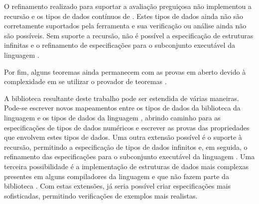 O refinamento realizado para suportar a avaliação preguiçosa não implementou a recursão e os tipos de dados contínuos de \HasCASL.
Estes tipos de dados ainda não são corretamente suportados pela ferramenta \Hets e sua verificação ou análise ainda não são possíveis.
Sem suporte a recursão, não é possível a especificação de estruturas infinitas e o refinamento de especificações para o subconjunto executável da linguagem \HasCASL.

Por fim, alguns teoremas ainda permanecem com as provas em aberto devido à complexidade em se utilizar o provador de teoremas \Isabelle.

A biblioteca resultante deste trabalho pode ser estendida de várias maneiras.
Pode-se escrever novos mapeamentos entre os tipos de dados da biblioteca da linguagem \CASL e os tipos de dados da linguagem \HOL, abrindo caminho para  as especificações de tipos de dados numéricos e escrever as provas das propriedades que envolvem estes tipos de dados.
Uma outra extensão possível é o suporte à recursão, permitindo a especificação de tipos de dados infinitos e, em seguida, o refinamento das especificações para o subconjunto executável da linguagem \HasCASL.
Uma terceira possibilidade é a implementação de estruturas de dados mais complexas presentes em alguns compiladores da linguagem \Haskell e que não fazem parte da biblioteca \Prelude.
Com estas extensões, já seria possível criar especificações mais sofisticadas, permitindo verificações de exemplos mais realistas.